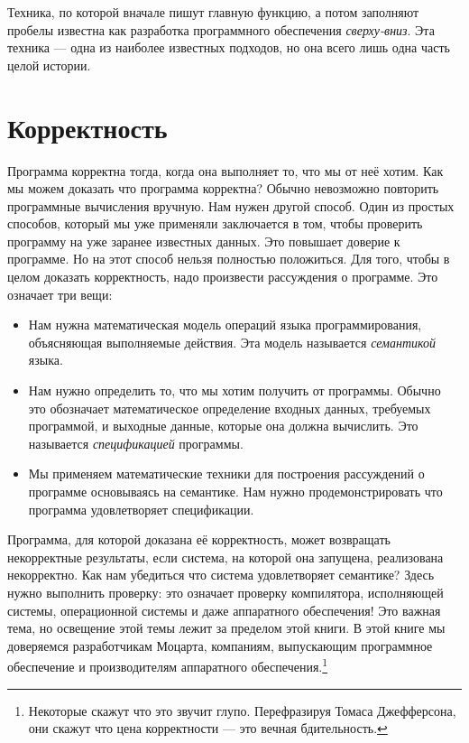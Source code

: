 Техника, по которой вначале пишут главную функцию, а потом заполняют пробелы известна как разработка программного обеспечения \emph{сверху-вниз}. Эта техника --- одна из наиболее известных подходов, но она всего лишь одна часть целой истории.

\section{Корректность}

Программа корректна тогда, когда она выполняет то, что мы от неё хотим. Как мы можем доказать что программа корректна? Обычно невозможно повторить программные вычисления вручную. Нам нужен другой способ. Один из простых способов, который мы уже применяли заключается в том, чтобы проверить программу на уже заранее известных данных. Это повышает доверие к программе. Но на этот способ нельзя полностью положиться. Для того, чтобы в целом доказать корректность, надо произвести рассуждения о программе. Это означает три вещи:

\begin{itemize}
\item{Нам нужна математическая модель операций языка программирования, объясняющая выполняемые действия. Эта модель называется \emph{семантикой} языка.}

\item{Нам нужно определить то, что мы хотим получить от программы. Обычно это обозначает математическое определение входных данных, требуемых программой, и выходные данные, которые она должна вычислить. Это называется \emph{спецификацией} программы.}

\item{Мы применяем математические техники для построения рассуждений о программе основываясь на семантике. Нам нужно продемонстрировать что программа удовлетворяет спецификации.}
\end{itemize}

Программа, для которой доказана её корректность, может возвращать некорректные результаты, если система, на которой она запущена, реализована некорректно. Как нам убедиться что система удовлетворяет семантике? Здесь нужно выполнить проверку: это означает проверку компилятора, исполняющей системы, операционной системы и даже аппаратного обеспечения! Это важная тема, но освещение этой темы лежит за пределом этой книги. В этой книге мы доверяемся разработчикам Моцарта, компаниям, выпускающим программное обеспечение и производителям аппаратного обеспечения.\footnote{Некоторые скажут что это звучит глупо. Перефразируя Томаса Джефферсона, они скажут что цена корректности --- это вечная бдительность.}



